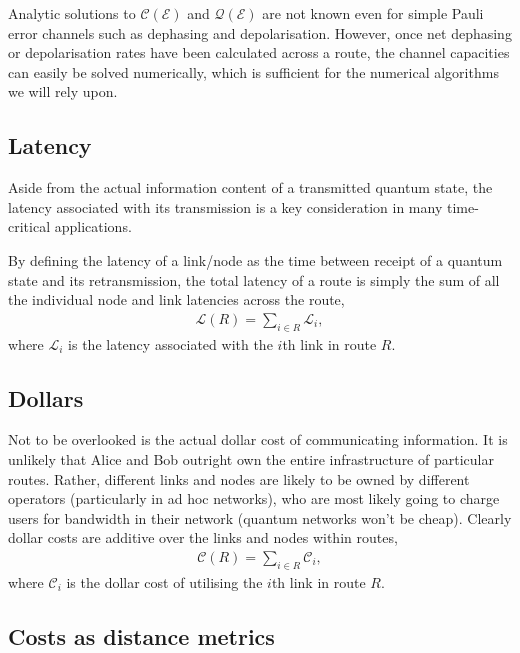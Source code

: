 \documentclass[aps,rmp,twocolumn,amsmath,amssymb,nofootinbib,superscriptaddress,longbibliography,floatfix]{revtex4-1}
\begin{document}
Analytic solutions to $\mathcal{C}(\mathcal{E})$ and $\mathcal{Q}(\mathcal{E})$ are not known even for simple Pauli error channels such as dephasing and depolarisation. However, once net dephasing or depolarisation rates have been calculated across a route, the channel capacities can easily be solved numerically, which is sufficient for the numerical algorithms we will rely upon.

%
%

\subsection{Latency} \label{sec:latency_metric}

Aside from the actual information content of a transmitted quantum state, the latency associated with its transmission is a key consideration in many time-critical applications.

By defining the latency of a link/node as the time between receipt of a quantum state and its retransmission, the total latency of a route is simply the sum of all the individual node and link latencies across the route,
\begin{align}
\mathcal{L}(R) = \sum_{i\in R} \mathcal{L}_i,
\end{align}
where $\mathcal{L}_i$ is the latency associated with the $i$th link in route $R$.

%
%

\subsection{Dollars} \label{sec:dollars}

Not to be overlooked is the actual dollar cost of communicating information. It is unlikely that Alice and Bob outright own the entire infrastructure of particular routes. Rather, different links and nodes are likely to be owned by different operators (particularly in ad hoc networks), who are most likely going to charge users for bandwidth in their network (quantum networks won't be cheap). Clearly dollar costs are additive over the links and nodes within routes,
\begin{align}
\mathcal{C}(R) = \sum_{i\in R} \mathcal{C}_i,
\end{align}
where $\mathcal{C}_i$ is the dollar cost of utilising the $i$th link in route $R$.

%
%

\subsection{Costs as distance metrics} \label{sec:cost_as_dist}
\end{document}
